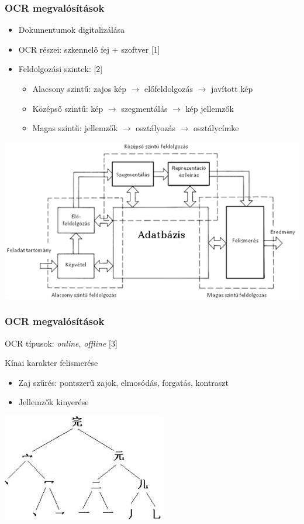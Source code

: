 \documentclass{beamer}
\begin{document}
\begin{frame}[fragile]
\frametitle{OCR megvalósítások}

\begin{itemize}
\item Dokumentumok digitalizálása
\item OCR részei: szkennelő fej + szoftver [1]
\item Feldolgozási szintek: [2]
\begin{itemize}
	\item Alacsony szintű: zajos kép $\rightarrow$ előfeldolgozás $\rightarrow$ javított kép
	\item Középső szintű: kép $\rightarrow$ szegmentálás $\rightarrow$ kép jellemzők
	\item Magas szintű: jellemzők $\rightarrow$ osztályozás $\rightarrow$ osztálycímke
\end{itemize}
\end{itemize}

\includegraphics[scale=0.45, center]{ocr}



\end{frame}

\begin{frame}[fragile]
\frametitle{OCR megvalósítások}

OCR típusok: \textit{online}, \textit{offline} [3]

\bigskip

{\large Kínai karakter felismerése}
\begin{itemize}
\item Zaj szűrés: pontszerű zajok, elmosódás, forgatás, kontraszt
\item Jellemzők kinyerése
\end{itemize}
\includegraphics[scale=0.6, center]{ocr_features}

\end{frame}
\end{document}
